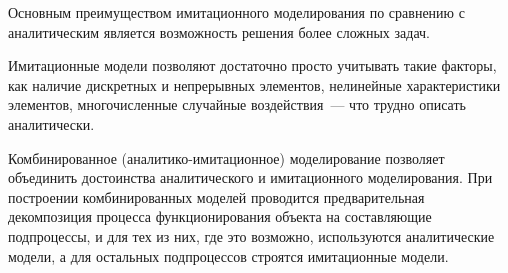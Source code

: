 Основным преимуществом имитационного моделирования по сравнению с аналитическим является возможность решения более сложных задач.

Имитационные модели позволяют достаточно просто учитывать такие факторы, как наличие дискретных и непрерывных элементов, нелинейные характеристики элементов, многочисленные случайные воздействия~--- что трудно описать аналитически.

Комбинированное (аналитико-имитационное) моделирование позволяет объединить достоинства аналитического и имитационного моделирования. При построении комбинированных моделей проводится предварительная декомпозиция процесса функционирования объекта на составляющие подпроцессы, и для тех из них, где это возможно, используются аналитические модели, а для остальных подпроцессов строятся имитационные модели.